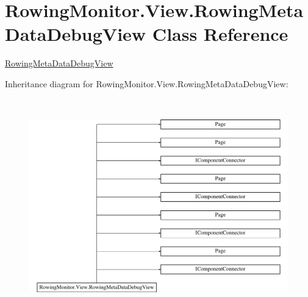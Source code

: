 \hypertarget{class_rowing_monitor_1_1_view_1_1_rowing_meta_data_debug_view}{}\section{Rowing\+Monitor.\+View.\+Rowing\+Meta\+Data\+Debug\+View Class Reference}
\label{class_rowing_monitor_1_1_view_1_1_rowing_meta_data_debug_view}


\hyperlink{class_rowing_monitor_1_1_view_1_1_rowing_meta_data_debug_view}{Rowing\+Meta\+Data\+Debug\+View}  


Inheritance diagram for Rowing\+Monitor.\+View.\+Rowing\+Meta\+Data\+Debug\+View\+:\begin{figure}[H]
\begin{center}
\leavevmode
\includegraphics[height=9.333333cm]{class_rowing_monitor_1_1_view_1_1_rowing_meta_data_debug_view}
\end{center}
\end{figure}

